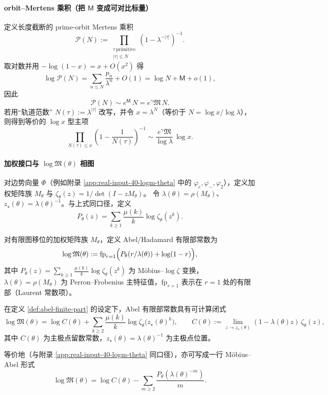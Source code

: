 \paragraph{orbit--Mertens 乘积（把 $\mathsf{M}$ 变成可对比标量）}
定义长度截断的 prime-orbit Mertens 乘积
\[
\mathcal{P}(N):=\prod_{\substack{\tau\ \mathrm{primitive}\\|\tau|\le N}}\left(1-\lambda^{-|\tau|}\right)^{-1}.
\]
取对数并用 $-\log(1-x)=x+O(x^2)$ 得
\[
\log\mathcal{P}(N)=\sum_{n\le N}\frac{p_n}{\lambda^n}+O(1)
=\log N+\mathsf{M}+o(1),
\]
因此
\[
\mathcal{P}(N)\sim e^{\mathsf{M}}\,N=e^{\gamma}\mathfrak{M}\,N.
\]
若用“轨道范数” $N(\tau):=\lambda^{|\tau|}$ 改写，并令 $x=\lambda^N$（等价于 $N=\log x/\log\lambda$），则得到等价的 $\log x$ 型主项
\[
\prod_{N(\tau)\le x}\left(1-\frac{1}{N(\tau)}\right)^{-1}
\sim \frac{e^{\gamma}\mathfrak{M}}{\log\lambda}\,\log x.
\]

\paragraph{加权接口与 \texorpdfstring{$\log\mathfrak{M}(\theta)$}{logM(theta)} 相图}
对边势向量 $\Phi$（例如附录 \ref{app:real-input-40-logm-theta} 中的 $\varphi_e,\varphi_-,\varphi_2$），定义加权矩阵族 $M_\theta$ 与
\(
\zeta_\theta(z)=1/\det(I-zM_\theta)
\)。
令 $\lambda(\theta)=\rho(M_\theta)$、$z_\star(\theta)=\lambda(\theta)^{-1}$。与上式同口径，定义
\[
P_\theta(z)=\sum_{k\ge 1}\frac{\mu(k)}{k}\log\zeta_\theta(z^k).
\]
\begin{definition}\label{def:abel-finite-part}
对有限图移位的加权矩阵族 $M_\theta$，定义 Abel/Hadamard 有限部常数为
\[
\log\mathfrak{M}(\theta):=\mathrm{fp}_{r=1}\Bigl(P_\theta(r/\lambda(\theta))+\log(1-r)\Bigr),
\]
其中 $P_\theta(z)=\sum_{k\ge 1}\frac{\mu(k)}{k}\log\zeta_\theta(z^k)$ 为 Möbius--$\log\zeta$ 变换，$\lambda(\theta)=\rho(M_\theta)$ 为 Perron--Frobenius 主特征值，$\mathrm{fp}_{r=1}$ 表示在 $r=1$ 处的有限部（Laurent 常数项）。
\end{definition}
\begin{proposition}\label{prop:abel-finite-part-mobius-zeta}
在定义 \ref{def:abel-finite-part} 的设定下，Abel 有限部常数具有可计算闭式
\[
\log\mathfrak{M}(\theta)
=\log C(\theta)+\sum_{k\ge 2}\frac{\mu(k)}{k}\log\zeta_\theta\bigl(z_\star(\theta)^k\bigr),
\qquad
C(\theta):=\lim_{z\to z_\star(\theta)}(1-\lambda(\theta)z)\,\zeta_\theta(z),
\]
其中 $C(\theta)$ 为主极点留数常数，$z_\star(\theta)=\lambda(\theta)^{-1}$ 为主极点位置。
\end{proposition}
等价地（与附录 \ref{app:real-input-40-logm-theta} 同口径），亦可写成一行 Möbius--Abel 形式
\[
\log\mathfrak{M}(\theta)=\log C(\theta)-\sum_{m\ge 2}\frac{P_\theta(\lambda(\theta)^{-m})}{m}.
\]

